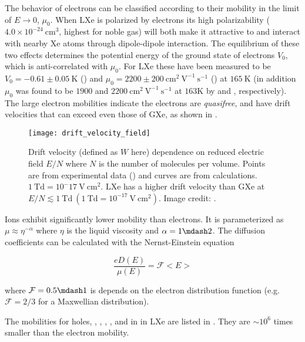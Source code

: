 The behavior of electrons can be classified according to their mobility in the limit of $E \rightarrow 0$, $\mu_0$.  When LXe is
polarized by electrons its high polarizability ($4.0 \times 10^{-24}\ \mathrm{cm^3}$, highest for noble gas) will both make it
attractive to \electron and interact with nearby Xe atoms through dipole-dipole interaction.  The equilibrium of these two effects
determines the potential energy of the ground state of electrons $V_0$, which is anti-correlated with $\mu_0$.  For LXe these have
been measured to be $V_0 = -0.61 \pm 0.05\ \mathrm{K}$ () and $\mu_0 = 2200 \pm 200\ \mathrm{cm^2\ V^{-1}\ s^{-1}}$
() at $165\ \mathrm{K}$ (in addition $\mu_0$ was found to be $1900$ and $2200\ \mathrm{cm^2\ V^{-1}\ s^{-1}}$
at $163\mathrm{K}$ by  and , respectively).  The large electron mobilities indicate the
electrons are \textit{quasifree}, and have drift velocities that can exceed even those of GXe, as shown in
.

\begin{figure}
\centering
\texttt{[image: drift\_velocity\_field]}
\caption{Drift velocity (defined as $W$ here) dependence on reduced electric field $E/N$ where $N$ is the number of molecules per
volume.  Points are from experimental data () and curves are from
calculations.  $1\ \mathrm{Td} = 10^-17\ \mathrm{V\ cm^2}$.  LXe has a higher drift velocity than GXe at
$E/N \lesssim 1\ \mathrm{Td}\ (1\ \mathrm{Td} = 10^{-17}\ \mathrm{V\ cm^2})$.  Image credit: .}
\label{fig:importance_procedure_effects_charge_drift_velocity}
\end{figure}

Ions exhibit significantly lower mobility than electrons.  It is parameterized as $\mu \approx \eta^{-\alpha}$ where $\eta$ is the
liquid viscosity and $\alpha = 1 \mdash 2$.  The diffusion coefficients can be calculated with the Nernst-Einstein equation

\begin{equation}
\frac{e D(E)}{\mu (E)} = \mathcal{F} <E>
\end{equation}

\noindent where $\mathcal{F} = 0.5 \mdash 1$ is depends on the electron distribution function (e.g. $\mathcal{F} = 2/3$ for a
Maxwellian distribution).

The mobilities for holes, , , , , and  in in LXe are listed in
.  They are ${\sim} 10^6$ times smaller than the electron mobility.

